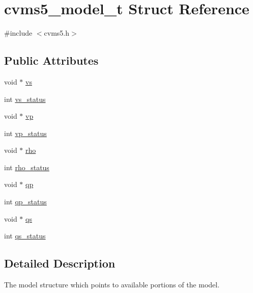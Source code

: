 \hypertarget{structcvms5__model__t}{\section{cvms5\+\_\+model\+\_\+t Struct Reference}
\label{structcvms5__model__t}
}


{\ttfamily \#include $<$cvms5.\+h$>$}

\subsection*{Public Attributes}
\begin{DoxyCompactItemize}
\item 
void $\ast$ \hyperlink{structcvms5__model__t_a26cacd56b7e4edc37a1b21f1a295fa43}{vs}
\item 
int \hyperlink{structcvms5__model__t_a77462a1085b53b84ce91d72943aa6801}{vs\+\_\+status}
\item 
void $\ast$ \hyperlink{structcvms5__model__t_a0195bcc697749db53879823f41d026bf}{vp}
\item 
int \hyperlink{structcvms5__model__t_ab42d17208dc3406887ed8fbc09150442}{vp\+\_\+status}
\item 
void $\ast$ \hyperlink{structcvms5__model__t_a9b06d2bca8552757e25f9c932389feea}{rho}
\item 
int \hyperlink{structcvms5__model__t_a62d69a02eee534fd95f678fd3f1031cf}{rho\+\_\+status}
\item 
void $\ast$ \hyperlink{structcvms5__model__t_aa3844d45e4d1ae2945748ba5942eac67}{qp}
\item 
int \hyperlink{structcvms5__model__t_afbd064c26423319fe50134a8033949d3}{qp\+\_\+status}
\item 
void $\ast$ \hyperlink{structcvms5__model__t_a6df0c937c0e0f2889957303687e47cd0}{qs}
\item 
int \hyperlink{structcvms5__model__t_a53665c8b1d9367a538cd635cc4007792}{qs\+\_\+status}
\end{DoxyCompactItemize}


\subsection{Detailed Description}
The model structure which points to available portions of the model. 

